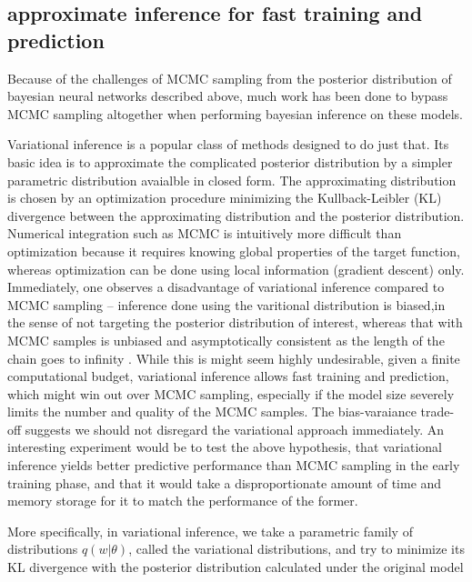 \documentclass{book}
\begin{document}
\begin{enumerate}
\section{approximate inference for fast training and prediction}

Because of the challenges of MCMC sampling from the posterior distribution of
bayesian neural networks described above, much work has been done to bypass MCMC
sampling altogether when performing bayesian inference on these models.

Variational inference \cite{jordan1999introduction,fox2012tutorial,blei2016variational} is a popular class of methods designed to do just that. Its basic idea is to approximate the complicated posterior distribution by a simpler parametric distribution avaialble in closed form. The approximating distribution is chosen by an optimization procedure minimizing the Kullback-Leibler (KL) divergence between the approximating distribution and the posterior distribution. Numerical integration such as MCMC is intuitively more difficult than optimization because it requires knowing global properties of the target function, whereas optimization can be done using local information (gradient descent) only. Immediately, one observes a disadvantage of variational inference compared to MCMC sampling -- inference done using the varitional distribution is biased,in the sense of not targeting the posterior distribution of interest, whereas that with MCMC samples is unbiased and asymptotically consistent as the length of the chain goes to infinity \cite{robert2013monte}. While this is might seem highly undesirable, given a finite computational budget, variational inference allows fast training and prediction, which might win out over MCMC sampling, especially if the model size severely limits the number and quality of the MCMC samples. The bias-varaiance trade-off suggests we should not disregard the variational approach immediately. An interesting experiment would be to test the above hypothesis, that variational inference yields better predictive performance than MCMC sampling in the early training phase, and that it would take a disproportionate amount of time and memory storage for it to match the performance of the former.

More specifically, in variational inference, we take a parametric family of distributions $q(w|\theta)$, called the variational distributions, and try to minimize its KL divergence with the posterior distribution calculated under the original model


\end{enumerate}
\end{document}
